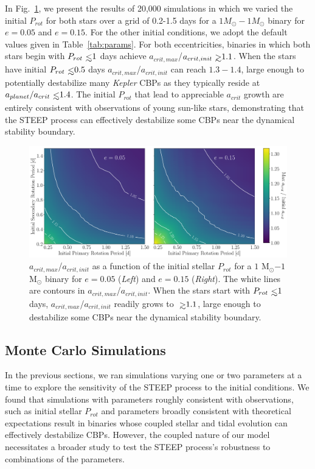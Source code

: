 In Fig.~\ref{fig:GG_contour}, we present the results of 20,000 simulations in which we varied the initial $P_{rot}$ for both stars over a grid of 0.2-1.5 days for a $1 M_{\odot} - 1 M_{\odot}$ binary for $e=0.05$ and $e=0.15$.  For the other initial conditions, we adopt the default values given in Table~\ref{tab:params}.  For both eccentricities, binaries in which both stars begin with $P_{rot} \lsim 1$ days achieve $a_{crit,max}$/$a_{crit,init} \gsim 1.1$.  When the stars have initial $P_{rot} \lsim 0.5$ days $a_{crit,max}$/$a_{crit,init}$ can reach $1.3-1.4$, large enough to potentially destabilize many {\it Kepler} CBPs as they typically reside at $a_{planet}/a_{crit} \lsim 1.4$.  The initial $P_{rot}$ that lead to appreciable $a_{crit}$ growth are entirely consistent with observations of young sun-like stars, demonstrating that the STEEP process can effectively destabilize some CBPs near the dynamical stability boundary.

\begin{figure}
	\includegraphics[width=\columnwidth]{GG_contour.pdf}
    \caption{$a_{crit,max}$/$a_{crit,init}$ as a function of the initial stellar $P_{rot}$ for a $1$ M$_{\odot}$$-1$ M$_{\odot}$ binary for $e = 0.05$ ({\it Left}) and $e = 0.15$ ({\it Right}).  The white lines are contours in $a_{crit,max}$/$a_{crit,init}$.  When the stars start with $P_{rot} \lsim 1$ days, $a_{crit,max}$/$a_{crit,init}$ readily grows to $\gsim 1.1$, large enough to destabilize some CBPs near the dynamical stability boundary.}
    \label{fig:GG_contour}
\end{figure}

\subsection{Monte Carlo Simulations} \label{sec:monte_carlo}

In the previous sections, we ran simulations varying one or two parameters at a time to explore the sensitivity of the STEEP process to the initial conditions.  We found that simulations with parameters roughly consistent with observations, such as initial stellar $P_{rot}$ and parameters broadly consistent with theoretical expectations result in binaries whose coupled stellar and tidal evolution can effectively destabilize CBPs.  However, the coupled nature of our model necessitates a broader study to test the STEEP process's robustness to combinations of the parameters.


